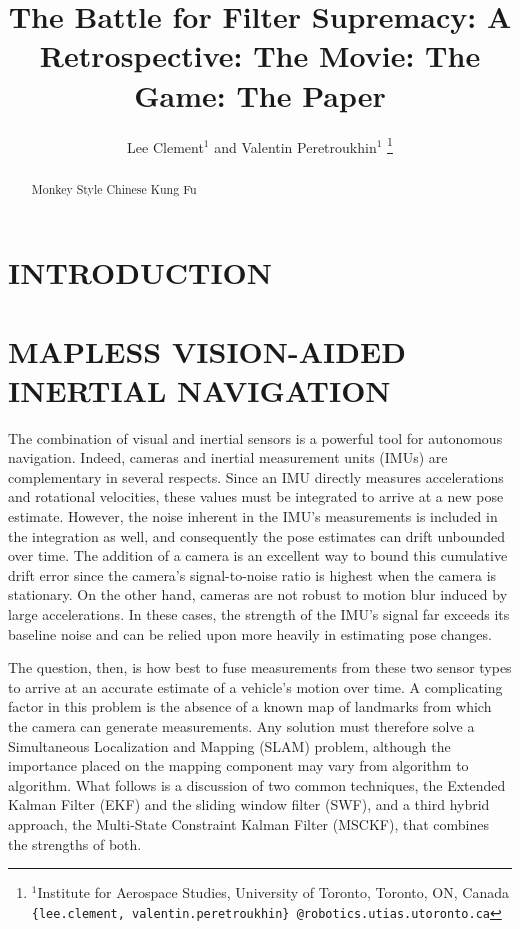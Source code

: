 \documentclass[letterpaper, 10 pt, conference]{ieeeconf}  %
\title{\LARGE \bf
The Battle for Filter Supremacy: A Retrospective: The Movie: The Game: The Paper
}
\author{Lee Clement$^{1}$ and Valentin Peretroukhin$^{1}$%
\thanks{$^{1}$Institute for Aerospace Studies,
        University of Toronto, Toronto, ON, Canada
        {\tt \{lee.clement, valentin.peretroukhin\} @robotics.utias.utoronto.ca}
        }%
}
\begin{document}
\maketitle
\thispagestyle{empty}
\pagestyle{empty}


\begin{abstract}

Monkey Style Chinese Kung Fu

\end{abstract}


\section{INTRODUCTION} \label{sec:introduction}
\cite{Li:2012:ICRA} \cite{Li:2013:IJRR}

\section{MAPLESS VISION-AIDED INERTIAL NAVIGATION}
The combination of visual and inertial sensors is a powerful tool for autonomous navigation.
Indeed, cameras and inertial measurement units (IMUs) are complementary in several respects.
Since an IMU directly measures accelerations and rotational velocities, these values must be integrated to arrive at a new pose estimate.
However, the noise inherent in the IMU's measurements is included in the integration as well, and consequently the pose estimates can drift unbounded over time.
The addition of a camera is an excellent way to bound this cumulative drift error since the camera's signal-to-noise ratio is highest when the camera is stationary.
On the other hand, cameras are not robust to motion blur induced by large accelerations.
In these cases, the strength of the IMU's signal far exceeds its baseline noise and can be relied upon more heavily in estimating pose changes.

The question, then, is how best to fuse measurements from these two sensor types to arrive at an accurate estimate of a vehicle's motion over time.
A complicating factor in this problem is the absence of a known map of landmarks from which the camera can generate measurements.
Any solution must therefore solve a Simultaneous Localization and Mapping (SLAM) problem, although the importance placed on the mapping component may vary from algorithm to algorithm.
What follows is a discussion of two common techniques, the Extended Kalman Filter (EKF) and the sliding window filter (SWF), and a third hybrid approach, the Multi-State Constraint Kalman Filter (MSCKF), that combines the strengths of both.
\end{document}

